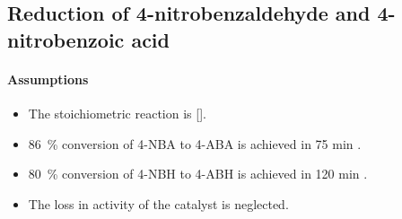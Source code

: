 

\subsection{Reduction of 4-nitrobenzaldehyde and 4-nitrobenzoic acid}
\paragraph{Assumptions}
\begin{itemize}
    \item The stoichiometric reaction is  [].
    \item \SI{86}{\percent} conversion of 4-NBA to 4-ABA is achieved in 75 min \cite{gowda_catalytic_2000}.
     \item \SI{80}{\percent} conversion of 4-NBH to 4-ABH is achieved in 120 min \cite{gowda_catalytic_2000}.
    \item The loss in activity of the catalyst is neglected.
\end{itemize}
